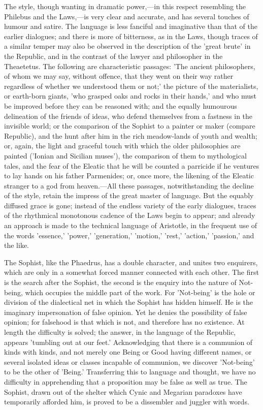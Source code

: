 \documentclass[11pt,letter]{article}
\begin{document}
\par  The style, though wanting in dramatic power,—in this respect resembling the Philebus and the Laws,—is very clear and accurate, and has several touches of humour and satire. The language is less fanciful and imaginative than that of the earlier dialogues; and there is more of bitterness, as in the Laws, though traces of a similar temper may also be observed in the description of the 'great brute' in the Republic, and in the contrast of the lawyer and philosopher in the Theaetetus. The following are characteristic passages: 'The ancient philosophers, of whom we may say, without offence, that they went on their way rather regardless of whether we understood them or not;' the picture of the materialists, or earth-born giants, 'who grasped oaks and rocks in their hands,' and who must be improved before they can be reasoned with; and the equally humourous delineation of the friends of ideas, who defend themselves from a fastness in the invisible world; or the comparison of the Sophist to a painter or maker (compare Republic), and the hunt after him in the rich meadow-lands of youth and wealth; or, again, the light and graceful touch with which the older philosophies are painted ('Ionian and Sicilian muses'), the comparison of them to mythological tales, and the fear of the Eleatic that he will be counted a parricide if he ventures to lay hands on his father Parmenides; or, once more, the likening of the Eleatic stranger to a god from heaven.—All these passages, notwithstanding the decline of the style, retain the impress of the great master of language. But the equably diffused grace is gone; instead of the endless variety of the early dialogues, traces of the rhythmical monotonous cadence of the Laws begin to appear; and already an approach is made to the technical language of Aristotle, in the frequent use of the words 'essence,' 'power,' 'generation,' 'motion,' 'rest,' 'action,' 'passion,' and the like.

\par  The Sophist, like the Phaedrus, has a double character, and unites two enquirers, which are only in a somewhat forced manner connected with each other. The first is the search after the Sophist, the second is the enquiry into the nature of Not-being, which occupies the middle part of the work. For 'Not-being' is the hole or division of the dialectical net in which the Sophist has hidden himself. He is the imaginary impersonation of false opinion. Yet he denies the possibility of false opinion; for falsehood is that which is not, and therefore has no existence. At length the difficulty is solved; the answer, in the language of the Republic, appears 'tumbling out at our feet.' Acknowledging that there is a communion of kinds with kinds, and not merely one Being or Good having different names, or several isolated ideas or classes incapable of communion, we discover 'Not-being' to be the other of 'Being.' Transferring this to language and thought, we have no difficulty in apprehending that a proposition may be false as well as true. The Sophist, drawn out of the shelter which Cynic and Megarian paradoxes have temporarily afforded him, is proved to be a dissembler and juggler with words.
\end{document}
